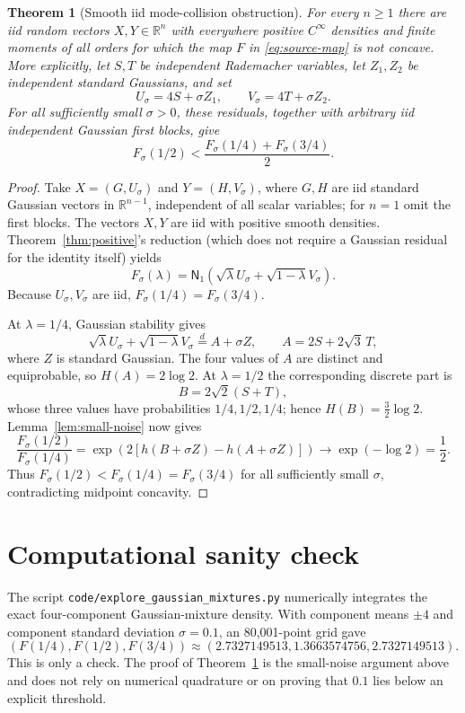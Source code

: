 \documentclass[11pt]{article}
\newtheorem{theorem}{Theorem}
\newcommand{\R}{\mathbb R}
\newcommand{\N}{\mathsf N}
\begin{document}
\begin{theorem}[Smooth iid mode-collision obstruction]\label{thm:negative}
For every $n\geq1$ there are iid random vectors $X,Y\in\R^n$ with everywhere
positive $C^\infty$ densities and finite moments of all orders for which the
map $F$ in \eqref{eq:source-map} is not concave. More explicitly, let
$S,T$ be independent Rademacher variables, let $Z_1,Z_2$ be independent
standard Gaussians, and set
\[
 U_\sigma=4S+\sigma Z_1,\qquad
 V_\sigma=4T+\sigma Z_2.
\]
For all sufficiently small $\sigma>0$, these residuals, together with
arbitrary iid independent Gaussian first blocks, give
\[
 F_\sigma(1/2)
 <\frac{F_\sigma(1/4)+F_\sigma(3/4)}2.
\]
\end{theorem}

\begin{proof}
Take $X=(G,U_\sigma)$ and $Y=(H,V_\sigma)$, where $G,H$ are iid standard
Gaussian vectors in $\R^{n-1}$, independent of all scalar variables; for
$n=1$ omit the first blocks. The vectors $X,Y$ are iid with positive smooth
densities. Theorem~\ref{thm:positive}'s reduction (which does not require a
Gaussian residual for the identity itself) yields
\[
 F_\sigma(\lambda)
 =\N_1(\sqrt\lambda U_\sigma+\sqrt{1-\lambda}V_\sigma).
\]
Because $U_\sigma,V_\sigma$ are iid,
$F_\sigma(1/4)=F_\sigma(3/4)$.

At $\lambda=1/4$, Gaussian stability gives
\[
 \sqrt\lambda U_\sigma+\sqrt{1-\lambda}V_\sigma
 \stackrel d= A+\sigma Z,
 \qquad A=2S+2\sqrt3\,T,
\]
where $Z$ is standard Gaussian. The four values of $A$ are distinct and
equiprobable, so $H(A)=2\log2$. At $\lambda=1/2$ the corresponding discrete
part is
\[
 B=2\sqrt2(S+T),
\]
whose three values have probabilities $1/4,1/2,1/4$; hence
$H(B)=\tfrac32\log2$. Lemma~\ref{lem:small-noise} now gives
\[
 \frac{F_\sigma(1/2)}{F_\sigma(1/4)}
 =\exp\!\left(2[h(B+\sigma Z)-h(A+\sigma Z)]\right)
 \longrightarrow
 \exp(-\log2)=\frac12.
\]
Thus $F_\sigma(1/2)<F_\sigma(1/4)=F_\sigma(3/4)$ for all sufficiently small
$\sigma$, contradicting midpoint concavity.
\end{proof}

\section{Computational sanity check}

The script \texttt{code/explore\_gaussian\_mixtures.py} numerically integrates
the exact four-component Gaussian-mixture density. With component means
$\pm4$ and component standard deviation $\sigma=0.1$, an 80,001-point grid
gave
\[
 (F(1/4),F(1/2),F(3/4))
 \approx(2.7327149513,1.3663574756,2.7327149513).
\]
This is only a check. The proof of Theorem~\ref{thm:negative} is the
small-noise argument above and does not rely on numerical quadrature or on
proving that $0.1$ lies below an explicit threshold.
\end{document}
